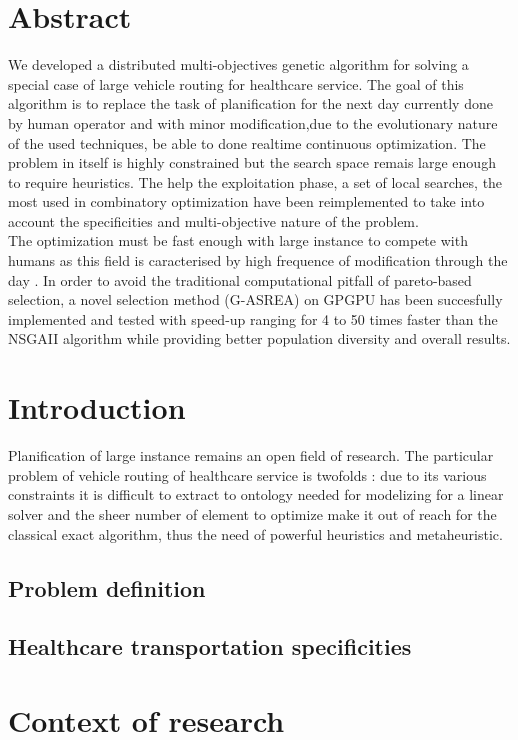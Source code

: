 \documentclass[11pt]{memoir}
\begin{document}
\section{Abstract}
We developed a distributed multi-objectives genetic algorithm for solving a special case of
large vehicle routing for healthcare service. The goal of this algorithm is to
replace the task of planification for the next day currently done by human operator and with
minor modification,due to the evolutionary nature of the used techniques, be able to
done realtime continuous optimization. The problem in itself is highly constrained
but the search space remais large enough to require heuristics. The help the
exploitation phase, a set of local searches, the most used in combinatory
optimization have been reimplemented to take into account the specificities and
multi-objective nature of the problem. \\
The optimization must be fast enough with large instance to compete with humans as
this field is  caracterised by high frequence of modification through the day . In
order to avoid the traditional computational pitfall of pareto-based selection, a
novel selection method (G-ASREA) on GPGPU has been succesfully implemented and tested with
speed-up ranging for 4 to 50 times faster than the NSGAII algorithm while providing
better population diversity and overall results.

\section{Introduction}
Planification of large instance remains an open field of research. The particular
problem of vehicle routing of healthcare service is twofolds : due to its
various constraints it is difficult to extract to ontology needed for modelizing for
a linear solver and the sheer number of element to optimize make it out of reach for
the classical exact algorithm, thus the need of powerful heuristics and
metaheuristic.
\subsection{Problem definition}

\subsection{Healthcare transportation specificities}
\label{sub:Healthcare transportation specificities}

\section{Context of research}
\label{sec:Context of research}
\end{document}
